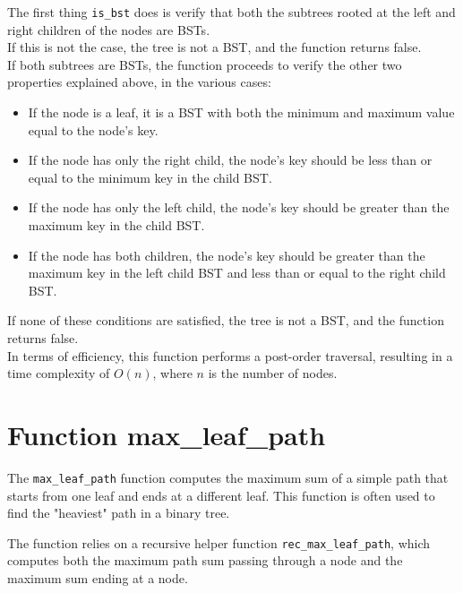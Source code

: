\documentclass[a4paper,12pt]{article}
\begin{document}
The first thing \texttt{is\_bst} does is verify that both the subtrees rooted at the left and right children of the nodes are BSTs.\\
If this is not the case, the tree is not a BST, and the function returns false.\\
If both subtrees are BSTs, the function proceeds to verify the other two properties explained above, in the various cases:
\begin{itemize}
    \item If the node is a leaf, it is a BST with both the minimum and maximum value equal to the node's key.
    \item If the node has only the right child, the node's key should be less than or equal to the minimum key in the child BST.
    \item If the node has only the left child, the node's key should be greater than the maximum key in the child BST.
    \item If the node has both children, the node's key should be greater than the maximum key in the left child BST and less than or equal to the right child BST.
\end{itemize}
If none of these conditions are satisfied, the tree is not a BST, and the function returns false.
\\
In terms of efficiency, this function performs a post-order traversal, resulting in a time complexity of \(O(n)\), where \(n\) is the number of nodes.

\newpage

\section{Function max\_leaf\_path}
The \texttt{max\_leaf\_path} function computes the maximum sum of a simple path that starts from one leaf and ends at a different leaf. This function is often used to find the "heaviest" path in a binary tree.

The function relies on a recursive helper function \texttt{rec\_max\_leaf\_path}, which computes both the maximum path sum passing through a node and the maximum sum ending at a node.
\end{document}
